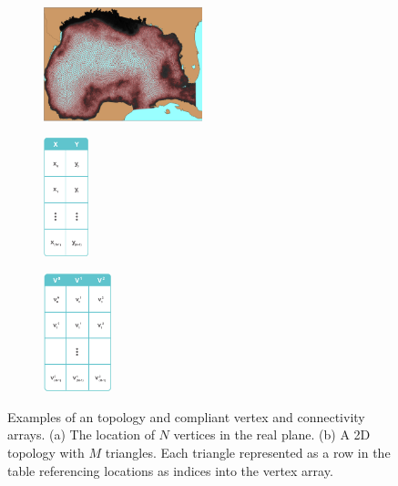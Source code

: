 \begin{figure}
  \centering
  \begin{subfigure}[t]{0.33\textwidth}
    \centering
    \includegraphics[height=1.3in]{../figs/USF_FVCOM_Hurricane_Ike_2D_final_run_with_waves_topology.png}
    \caption{}
    \label{fig:usf_fvcom_ugrid}
  \end{subfigure}
  \begin{subfigure}[t]{0.32\textwidth}
    \centering
    \includegraphics[height=1.35in]{../figs/xy_table}
    \caption{}
    \label{fig:xytable}
  \end{subfigure}
  \begin{subfigure}[t]{0.32\textwidth}
    \centering
    \includegraphics[height=1.35in]{../figs/v_table}
    \caption{}
    \label{fig:vtable}
  \end{subfigure}
  \caption{Examples of an \ugrid{} topology and \cfugrid compliant
    vertex and connectivity arrays. (a) The location of $N$
    vertices in the real plane. (b) A 2D topology with
    $M$ triangles. Each triangle represented as a row in the table
    referencing locations as indices into the vertex array.}
\end{figure}
